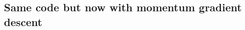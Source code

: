 \documentclass[%
oneside,                 %
final,                   %
10pt]{article}
\begin{document}
\subsection*{Same code but now with momentum gradient descent}
\end{document}
